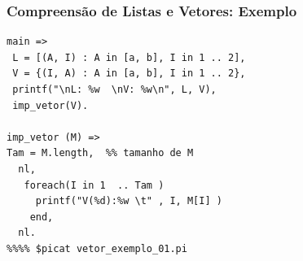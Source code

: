  \begin{frame}[fragile]
 \frametitle{Compreensão de Listas e Vetores: Exemplo}
\begin{footnotesize}

\begin{verbatim}
main =>
 L = [(A, I) : A in [a, b], I in 1 .. 2],
 V = {(I, A) : A in [a, b], I in 1 .. 2},
 printf("\nL: %w  \nV: %w\n", L, V),
 imp_vetor(V).

imp_vetor (M) => 
Tam = M.length,  %% tamanho de M
  nl,
   foreach(I in 1  .. Tam )
     printf("V(%d):%w \t" , I, M[I] )
    end,
  nl.
%%%% $picat vetor_exemplo_01.pi
\end{verbatim}

\end{footnotesize}
 
\end{frame}


